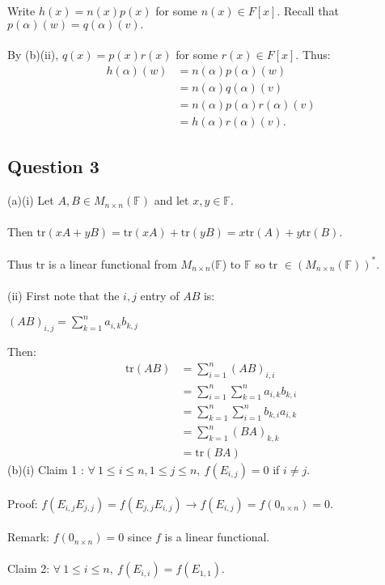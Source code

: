 \documentclass{article}
\begin{document}
 Write $h(x) = n(x)p(x)$ for some $n(x) \in F[x].$ Recall that $p(\alpha)(w) = q(\alpha)(v).$\\\\
By (b)(ii), $q(x) = p(x)r(x)$ for some $r(x) \in F[x].$ Thus:\begin{align*}
 h(\alpha)(w) &= n(\alpha)p(\alpha)(w)\\ &= n(\alpha)q(\alpha)(v)\\ &= n(\alpha)p(\alpha)r(\alpha)(v)\\ &= h(\alpha)r(\alpha)(v).
\end{align*}
\subsection*{Question 3}
(a)(i) Let $A,B\in M_{n\times n}(\mathbb{F})$ and let $x,y\in \mathbb{F}.$\\\\
Then $\text{tr}(xA+yB) = \text{tr}(xA) + \text{tr}(yB) = x\text{tr}(A) + y\text{tr}(B).$\\\\
Thus tr is a linear functional from $M_{n\times n}(\mathbb{F}$) to $\mathbb{F}$ so tr $\in (M_{n\times n}(\mathbb{F}))^*.$\\\\
(ii) First note that the $i,j$ entry of $AB$ is:\begin{center}
$(AB)_{i,j} = \sum\limits_{k=1}^{n} a_{i,k}b_{k,j}$
\end{center}
Then: \begin{align*}
    \text{tr}(AB) &= \sum\limits_{i=1}^n (AB)_{i,i}\\ &= \sum\limits_{i=1}^n \sum\limits_{k=1}^n a_{i,k}b_{k,i}\\ &= \sum\limits_{k=1}^n \sum\limits_{i=1}^n b_{k,i}a_{i,k}\\ &= \sum\limits_{k=1}^n (BA)_{k,k}\\ &= \text{tr}(BA)
\end{align*}
(b)(i) Claim 1 : $\forall\ 1\leq i \leq n, 1\leq j \leq n,\ f(E_{i,j}) = 0$ if $i\neq j$.\\\\
Proof: $f(E_{i,j}E_{j,j}) = f(E_{j,j}E_{i,j}) \to f(E_{i,j}) = f(0_{n\times n}) = 0.$\\\\
Remark: $f(0_{n\times n}) = 0$ since $f$ is a linear functional.\\\\
Claim 2: $\forall\ 1\leq i \leq n,\ f(E_{i,i}) = f(E_{1,1}).$\\\\
\end{document}
